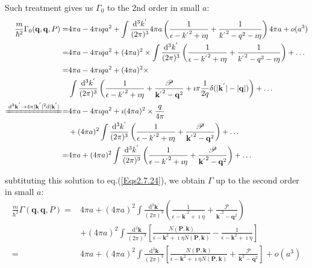 Such treatment gives us $\Gamma_0$ to the 2nd order in small $a$:
\[ \begin{split} \frac{m}{\hbar^2} \Gamma_0(\mathbf{q},\mathbf{q},P) =& 4\pi a - 4\pi \imath q a^2 + \int \frac{\mathrm{d}^3 k^{'}}{(2\pi)^3} 4\pi a \left( \frac{1}{\epsilon-{k^{'}}^2 + \imath \eta} + \frac{1}{{k^{'}}^2-q^2-\imath \eta} \right)4\pi a + o(a^3)\\
=& 4\pi a - 4\pi \imath q a^2 + (4\pi a)^2 \times \int \frac{\mathrm{d}^3 k^{'}}{(2\pi)^3} \left( \frac{1}{\epsilon-{k^{'}}^2 + \imath \eta} + \frac{1}{{k^{'}}^2-q^2-\imath \eta} \right) + \ldots\\
=& 4\pi a - 4\pi \imath q a^2 + (4\pi a)^2 \times\\
&\int \frac{\mathrm{d}^3 k^{'}}{(2\pi)^3} \left( \frac{1}{\epsilon-{k^{'}}^2 + \imath \eta} + \frac{\mathscr{P}}{{\mathbf{k}^{'}}^2-\mathbf{q}^2} + \imath \pi \frac{1}{2q} \delta(|\mathbf{k}^{'}|-|\mathbf{q}|) \right) + \ldots\\
\xlongequal{\mathrm{d}^3 \mathbf{k}^{'} \rightarrow 4\pi |\mathbf{k}^{'}|^2 \mathrm{d} |\mathbf{k}^{'}|}
=&4\pi a - 4\pi \imath q a^2+ \imath (4\pi a)^2 \times \frac{q}{4\pi}
\\&+ (4\pi a)^2\int \frac{\mathrm{d}^3 k^{'}}{(2\pi)^3} \left( \frac{1}{\epsilon-{k^{'}}^2 + \imath \eta} + \frac{\mathscr{P}}{{\mathbf{k}^{'}}^2-\mathbf{q}^2} \right) + \ldots\\
=&4\pi a + (4\pi a)^2\int \frac{\mathrm{d}^3 k^{'}}{(2\pi)^3} \left( \frac{1}{\epsilon-{k^{'}}^2 + \imath \eta} + \frac{\mathscr{P}}{{\mathbf{k}^{'}}^2-\mathbf{q}^2} \right) + \ldots
\end{split} \]

subtituting this solution to eq.(\ref{Eqs2.7.24}), we obtain $\Gamma$ up to the second order in small $a$:
\begin{equation} \label{Eqs2.7.26} \begin{split}
\frac{m}{\hbar^2}\Gamma(\mathbf{q},\mathbf{q},P) =& 4\pi a + (4\pi a)^2 \int \frac{\mathrm{d}^3 \mathbf{k}^{'}}{(2\pi)^3} \left( \frac{1}{\epsilon-{\mathbf{k}^{'}}^2 + \imath \eta} + \frac{\mathscr{P}}{{\mathbf{k}^{'}}^2-\mathbf{q}^2} \right)\\
&+ (4\pi a)^2 \int \frac{\mathrm{d}^3 \mathbf{k}}{(2\pi)^3} \left[ \frac{N(\mathbf{P},\mathbf{k})}{\epsilon-\mathbf{k}^2+\imath \eta N(\mathbf{P},\mathbf{k})} - \frac{1}{\epsilon-{\mathbf{k}}^2 + \imath \eta} \right]\\
=& 4\pi a + (4\pi a)^2 \int \frac{\mathrm{d}^3 \mathbf{k}}{(2\pi)^3}\left[ \frac{N(\mathbf{P},\mathbf{k})}{\epsilon-\mathbf{k}^2+\imath \eta N(\mathbf{P},\mathbf{k})} + \frac{\mathscr{P}}{{\mathbf{k}}^2-\mathbf{q}^2} \right] + o(a^3)
\end{split} \end{equation}

